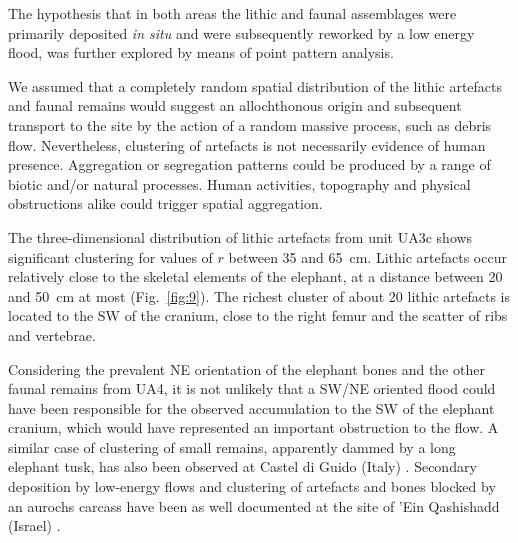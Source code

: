\documentclass[preprint,authoryear,times]{elsarticle} %
\begin{document}


The hypothesis that in both areas the lithic and faunal assemblages were primarily deposited \emph{in situ} and were subsequently reworked by a low energy flood, was further explored by means of point pattern analysis.

We assumed that a completely random spatial distribution of the lithic artefacts and faunal remains would suggest an allochthonous origin and subsequent transport to the site by the action of a random massive process, such as debris flow. Nevertheless, clustering of artefacts is not necessarily evidence of human presence. Aggregation or segregation patterns could be produced by a range of biotic and/or natural processes. Human activities, topography and physical obstructions alike could trigger spatial aggregation.


The three-dimensional distribution of lithic artefacts from unit UA3c shows significant clustering for values of $r$ between 35 and 65~cm. Lithic artefacts occur relatively close to the skeletal elements of the elephant, at a distance between 20 and 50~cm at most (Fig.~\ref{fig:9}). The richest cluster of about 20 lithic artefacts is located to the SW of the cranium, close to the right femur and the scatter of ribs and vertebrae.

Considering the prevalent NE orientation of the elephant bones and the other faunal remains from UA4, it is not unlikely that a SW/NE oriented flood could have been responsible for the observed accumulation to the SW of the elephant cranium, which would have represented an important obstruction to the flow. A similar case of clustering of small remains, apparently dammed by a long elephant tusk, has also been observed at Castel di Guido (Italy) \citep{Boschian2010}. Secondary deposition by low-energy flows and clustering of artefacts and bones blocked by an aurochs carcass have been as well documented at the site of 'Ein Qashishadd (Israel) \citep{Hovers2014}.
\end{document}
